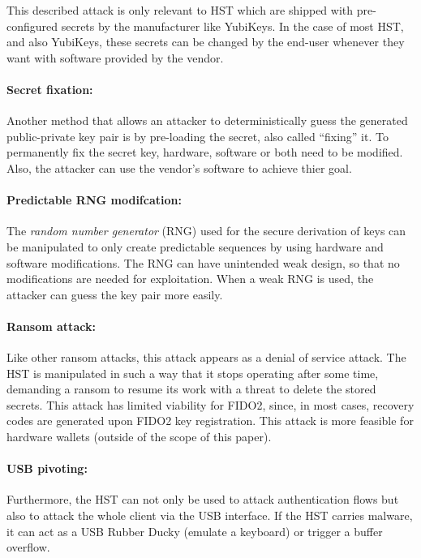 \documentclass[runningheads]{llncs}
\begin{document}
This described attack is only relevant to HST which are shipped with pre-configured secrets by the manufacturer like YubiKeys. In the case of most HST, and also YubiKeys, these secrets can be changed by the end-user whenever they want with software provided by the vendor.

\paragraph{Secret fixation:}
Another method that allows an attacker to deterministically guess the generated public-private key pair is by pre-loading the secret, also called ``fixing''  it. To permanently fix the secret key, hardware, software or both need to be modified. Also, the attacker can use the vendor's software to achieve thier goal.

\paragraph{Predictable RNG modifcation:}
The \textit{random number generator} (RNG) used for the secure derivation of keys can be manipulated to only create predictable sequences by using hardware and software modifications. The RNG can have unintended weak design, so that no modifications are needed for exploitation. When a weak RNG is used, the attacker can guess the key pair more easily.

\paragraph{Ransom attack:}
Like other ransom attacks, this attack appears as a denial of service attack. The HST is manipulated in such a way that it stops operating after some time, demanding a ransom to resume its work with a threat to delete the stored secrets. This attack has limited viability for FIDO2, since, in most cases, recovery codes are generated upon FIDO2 key registration. This attack is more feasible for hardware wallets (outside of the scope of this paper).

\paragraph{USB pivoting:}
Furthermore, the HST can not only be used to attack authentication flows but also to attack the whole client via the USB interface. If the HST carries malware, it can act as a USB Rubber Ducky (emulate a keyboard) or trigger a buffer overflow.
\end{document}

